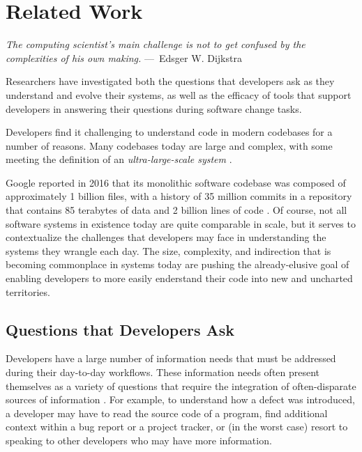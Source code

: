 
\chapter{Related Work}
\label{ch:RelatedWork}

\begin{epigraph}
    \emph{
       The computing scientist’s main challenge is not to get confused by the 
       complexities of his own making.
     } ---~Edsger W. Dijkstra
\end{epigraph}

\noindent Researchers have investigated both the questions that developers ask 
as they understand and evolve their systems, as well as the efficacy of tools 
that support developers in answering their questions during software change 
tasks.

\par Developers find it challenging to understand code in modern codebases for
a number of reasons.
Many codebases today are large and complex, with some meeting the definition of 
an \emph{ultra-large-scale system} \cite{feiler-2006-ulss}.

\par Google reported in 2016 that its monolithic software codebase was composed
of approximately 1 billion files, with a history of 35 million commits in a
repository that contains 85 terabytes of data and 2 billion lines of code
\cite{potvin-2016-google}.
Of course, not all software systems in existence today are quite comparable in 
scale, but it serves to contextualize the challenges that developers may face in
understanding the systems they wrangle each day.
The size, complexity, and indirection that is becoming commonplace in systems
today \cite{latoza-2010-reach} are pushing the already-elusive goal of
enabling developers to more easily enderstand their code into new and 
uncharted territories.

\section{Questions that Developers Ask}
\label{sec:QuestionsThatDeveloperAsk}

\noindent Developers have a large number of information needs that must be
addressed during their day-to-day workflows.
These information needs often present themselves as a variety of questions
that require the integration of often-disparate sources of information
\cite{fritz-2010-info-frag}.
For example, to understand how a defect was introduced, a developer may have to
read the source code of a program, find additional context within a bug report
or a project tracker, or (in the worst case) resort to speaking to other 
developers who may have more information. 

